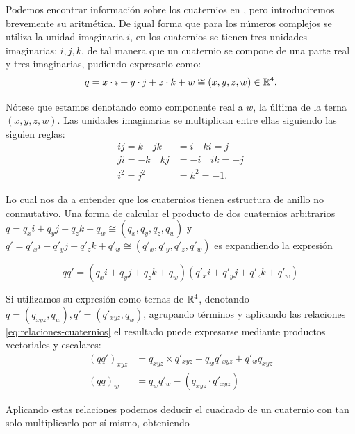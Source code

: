 Podemos encontrar información sobre los cuaternios en \cite{quaternions}, pero introduciremos brevemente su aritmética. De igual forma que para los números complejos se utiliza la unidad imaginaria $i$, en los cuaternios se tienen tres unidades imaginarias: $i,j,k$, de tal manera que un cuaternio se compone de una parte real y tres imaginarias, pudiendo expresarlo como:
\begin{equation}
    q = x\cdot i + y\cdot j + z \cdot k + w \cong (x,y,z,w)\in \mathbb{R}^4.
\end{equation}

Nótese que estamos denotando como componente real a $w$, la última de la terna $(x,y,z,w)$. Las unidades imaginarias se multiplican entre ellas siguiendo las siguien reglas:
\begin{equation}
    \label{eq:relaciones-cuaternios}
    \begin{split}
        ij = k \quad jk &= i \quad ki = j \\
        ji = -k \quad kj &= -i \quad ik = -j \\
        i^2 = j^2 &= k^2 = -1. 
    \end{split}
\end{equation}

Lo cual nos da a entender que los cuaternios tienen estructura de anillo no conmutativo. Una forma de calcular el producto de dos cuaternios arbitrarios $q = q_x i + q_y j + q_z k + q_w\cong (q_x,q_y,q_z,q_w)$ y $q' = q'_x i + q'_y j + q'_z  k + q'_w\cong (q'_x,q'_y,q'_z,q'_w)$ es expandiendo la expresión

\begin{equation}
    qq' = (q_x i + q_y j + q_z k + q_w)(q'_x i + q'_y j + q'_z k + q'_w) 
\end{equation}

Si utilizamos su expresión como ternas de $\mathbb{R}^4$, denotando $q=(q_{xyz},q_w), q'=(q'_{xyz},q_w)$, agrupando términos y aplicando las relaciones \ref{eq:relaciones-cuaternios} el resultado puede expresarse mediante productos vectoriales y escalares:
\begin{equation}
    \label{eq:producto-cuaternios}
    \begin{split}
        (qq')_{xyz} &= q_{xyz}\times q'_{xyz} + q_w q'_{xyz} + q'_wq_{xyz} \\
        (qq)_w &= q_wq'_w - (q_{xyz}\cdot q'_{xyz})
    \end{split}
\end{equation}

Aplicando estas relaciones podemos deducir el cuadrado de un cuaternio con tan solo multiplicarlo por sí mismo, obteniendo

